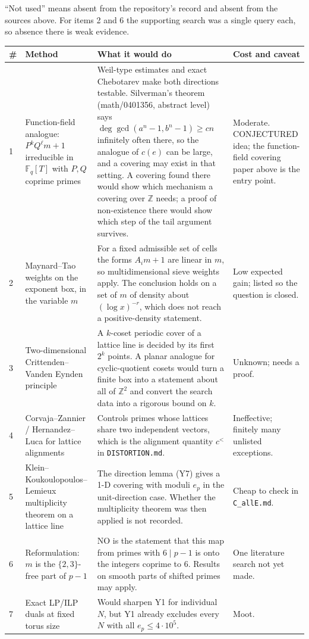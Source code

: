 \documentclass[11pt,a4paper]{article}
\begin{document}
``Not used'' means absent from the repository's record and absent from the sources above. For items 2 and 6 the supporting search was a single query each, so absence there is weak evidence.

\begin{longtable}{P{0.6cm}P{3.6cm}P{7.7cm}P{3.1cm}}
\toprule
\# & Method & What it would do & Cost and caveat\\\midrule
{} & Function-field analogue: $P^kQ^\ell m+1$ irreducible in $\mathbb F_q[T]$ with $P,Q$ coprime primes & Weil-type estimates and exact Chebotarev make both directions testable. Silverman's theorem (math/0401356, abstract level) says $\deg\gcd(a^n-1,b^n-1)\ge cn$ infinitely often there, so the analogue of $c(e)$ can be large, and a covering may exist in that setting. A covering found there would show which mechanism a covering over $\mathbb Z$ needs; a proof of non-existence there would show which step of the tail argument survives. & Moderate. CONJECTURED idea; the function-field covering paper above is the entry point.\\
2 & Maynard--Tao weights on the exponent box, in the variable $m$ & For a fixed admissible set of cells the forms $A_im+1$ are linear in $m$, so multidimensional sieve weights apply. The conclusion holds on a set of $m$ of density about $(\log x)^{-r}$, which does not reach a positive-density statement. & Low expected gain; listed so the question is closed.\\
3 & Two-dimensional Crittenden--Vanden Eynden principle & A $k$-coset periodic cover of a lattice line is decided by its first $2^k$ points. A planar analogue for cyclic-quotient cosets would turn a finite box into a statement about all of $\mathbb Z^2$ and convert the search data into a rigorous bound on $k$. & Unknown; needs a proof.\\
4 & Corvaja--Zannier / Hernandez--Luca for lattice alignments & Controls primes whose lattices share two independent vectors, which is the alignment quantity $c^<$ in \texttt{DISTORTION.md}. & Ineffective; finitely many unlisted exceptions.\\
5 & Klein--Koukoulopoulos--Lemieux multiplicity theorem on a lattice line & The direction lemma (Y7) gives a 1-D covering with moduli $e_p$ in the unit-direction case. Whether the multiplicity theorem was then applied is not recorded. & Cheap to check in \texttt{C\_allE.md}.\\
6 & Reformulation: $m$ is the $\{2,3\}$-free part of $p-1$ & NO is the statement that this map from primes with $6\mid p-1$ is onto the integers coprime to $6$. Results on smooth parts of shifted primes may apply. & One literature search not yet made.\\
7 & Exact LP/ILP duals at fixed torus size & Would sharpen Y1 for individual $N$, but Y1 already excludes every $N$ with all $e_p\le4\cdot10^5$. & Moot.\\
\bottomrule
\end{longtable}
\end{document}
